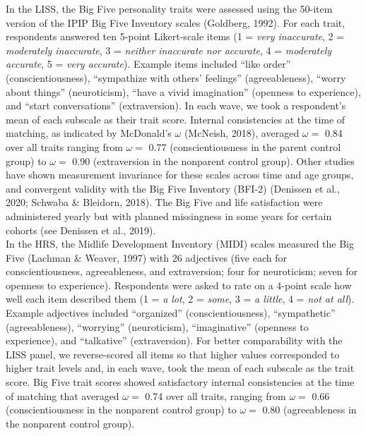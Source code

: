 \documentclass[
  english,
  man, noextraspace,floatsintext]{apa7}
\begin{document}
In the LISS, the Big Five personality traits were assessed using the 50-item version of the IPIP Big Five Inventory scales (Goldberg, 1992). For each trait, respondents answered ten 5-point Likert-scale items (1 = \emph{very inaccurate}, 2 = \emph{moderately inaccurate}, 3 = \emph{neither inaccurate nor accurate}, 4 = \emph{moderately accurate}, 5 = \emph{very accurate}). Example items included \enquote{like order} (conscientiousness), \enquote{sympathize with others' feelings} (agreeableness), \enquote{worry about things} (neuroticism), \enquote{have a vivid imagination} (openness to experience), and \enquote{start conversations} (extraversion). In each wave, we took a respondent's mean of each subscale as their trait score. Internal consistencies at the time of matching, as indicated by McDonald's \(\omega\) (McNeish, 2018), averaged \(\omega =\) 0.84 over all traits ranging from \(\omega =\) 0.77 (conscientiousness in the parent control group) to \(\omega =\) 0.90 (extraversion in the nonparent control group). Other studies have shown measurement invariance for these scales across time and age groups, and convergent validity with the Big Five Inventory (BFI-2) (Denissen et al., 2020; Schwaba \& Bleidorn, 2018). The Big Five and life satisfaction were administered yearly but with planned missingness in some years for certain cohorts (see Denissen et al., 2019). \\
In the HRS, the Midlife Development Inventory (MIDI) scales measured the Big Five (Lachman \& Weaver, 1997) with 26 adjectives (five each for conscientiousness, agreeableness, and extraversion; four for neuroticism; seven for openness to experience). Respondents were asked to rate on a 4-point scale how well each item described them (1 = \emph{a lot}, 2 = \emph{some}, 3 = \emph{a little}, 4 = \emph{not at all}). Example adjectives included \enquote{organized} (conscientiousness), \enquote{sympathetic} (agreeableness), \enquote{worrying} (neuroticism), \enquote{imaginative} (openness to experience), and \enquote{talkative} (extraversion). For better comparability with the LISS panel, we reverse-scored all items so that higher values corresponded to higher trait levels and, in each wave, took the mean of each subscale as the trait score. Big Five trait scores showed satisfactory internal consistencies at the time of matching that averaged \(\omega =\) 0.74 over all traits, ranging from \(\omega =\) 0.66 (conscientiousness in the nonparent control group) to \(\omega =\) 0.80 (agreeableness in the nonparent control group).
\end{document}

